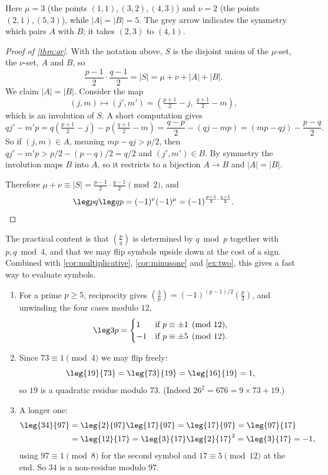 Here $\mu = 3$ (the points $(1,1), (3,2), (4,3)$) and $\nu = 2$ (the points $(2,1), (5,3)$), while $|A| = |B| = 5$. The grey arrow indicates the symmetry which pairs $A$ with $B$; it takes $(2,3)$ to $(4,1)$.

\begin{proof}[Proof of \autoref{thm:qr}]
	With the notation above, $S$ is the disjoint union of the $\mu$-set, the $\nu$-set, $A$ and $B$, so
	$$
	\frac{p-1}2 \cdot \frac{q-1}2 = |S| = \mu + \nu + |A| + |B|.
	$$
	We claim $|A| = |B|$. Consider the map
	$$
	(j, m) \longmapsto (j', m') = \left(\tfrac{p+1}2 - j, \ \tfrac{q+1}2 - m\right),
	$$
	which is an involution of $S$. A short computation gives
	$$
	qj' - m'p = q\left(\tfrac{p+1}2 - j\right) - p\left(\tfrac{q+1}2 - m\right) = \frac{q - p}{2} - (qj - mp) = (mp - qj) - \frac{p - q}{2}.
	$$
	So if $(j,m) \in A$, meaning $mp - qj > p/2$, then $qj' - m'p > p/2 - (p-q)/2 = q/2$ and $(j', m') \in B$. By symmetry the involution maps $B$ into $A$, so it restricts to a bijection $A \to B$ and $|A| = |B|$.

	Therefore $\mu + \nu \equiv |S| = \frac{p-1}2\cdot\frac{q-1}2 \pmod 2$, and
	$$
	\leg pq \leg qp = (-1)^{\nu}(-1)^{\mu} = (-1)^{\frac{p-1}2 \cdot \frac{q-1}2}. \qedhere
	$$
\end{proof}

The practical content is that $\left( \frac pq \right)$ is determined by $q \bmod p$ together with $p, q \bmod 4$, and that we may flip symbols upside down at the cost of a sign. Combined with \autoref{cor:multiplicative}, \autoref{cor:minusone} and \autoref{ex:two}, this gives a fast way to evaluate symbols.

\begin{example}
	\begin{enumerate}[label=(\roman*)]
		\item For a prime $p \geq 5$, reciprocity gives $\left( \frac 3p \right) = (-1)^{(p-1)/2}\left( \frac p3 \right)$, and unwinding the four cases modulo $12$,
		$$
		\leg 3p = \begin{cases} 1 & \text{if } p \equiv \pm 1 \pmod{12}, \\ -1 & \text{if } p \equiv \pm 5 \pmod{12}. \end{cases}
		$$
		\item Since $73 \equiv 1 \pmod 4$ we may flip freely:
		$$
		\leg{19}{73} = \leg{73}{19} = \leg{16}{19} = 1,
		$$
		so $19$ is a quadratic residue modulo $73$. (Indeed $26^2 = 676 = 9 \times 73 + 19$.)
		\item A longer one:
		\begin{align*}
			\leg{34}{97} &= \leg{2}{97}\leg{17}{97} = \leg{17}{97} = \leg{97}{17} \\
			&= \leg{12}{17} = \leg{3}{17}\leg{2}{17}^2 = \leg{3}{17} = -1,
		\end{align*}
		using $97 \equiv 1 \pmod 8$ for the second symbol and $17 \equiv 5 \pmod{12}$ at the end. So $34$ is a non-residue modulo $97$.
	\end{enumerate}
\end{example}

